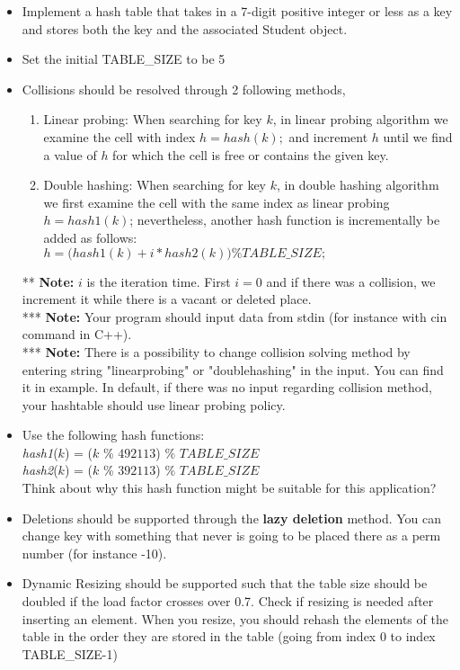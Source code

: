 \documentclass[times, 12pt]{article}
\begin{document}
\begin{itemize}
    \item Implement a hash table that takes in a 7-digit positive integer or less as a key and stores both the key and the associated Student object.
    
    \item Set the initial TABLE\_SIZE to be 5
    
    \item Collisions should be resolved through 2 following methods,
    \begin{enumerate}
        \item Linear probing: When searching for key $k$, in linear probing algorithm we examine the cell with index $h = hash(k);$ and increment $h$ until we find a value of $h$ for which the cell is free or contains the given key.
        \item Double hashing: When searching for key $k$, in double hashing algorithm we first examine the cell with the same index as linear probing $h = hash1(k)$; nevertheless, another hash function is incrementally be added as follows:\\
        $h = \Big(hash1(k) + i * hash2(k)\Big) \%TABLE\_SIZE;$
    \end{enumerate}
    ** \textbf{Note: }$i$ is the iteration time. First $i=0$ and if there was a collision, we increment it while there is a vacant or deleted place.\\
    *** \textbf{Note: }Your program should input data from stdin (for instance with cin command in C++).\\
    *** \textbf{Note: }There is a possibility to change collision solving method by entering string "linearprobing" or "doublehashing" in the input. You can find it in example. In default, if there was no input regarding collision method, your hashtable should use linear probing policy.

    \item Use the following hash functions:\\ \textit{hash1}($k$) = ($k$ \% $492113$) \% $TABLE\_SIZE$\\ \textit{hash2}($k$) = ($k$ \% $392113$) \% $TABLE\_SIZE$\\
    Think about why this hash function might be suitable for this application?

    \item Deletions should be supported through the \textbf{lazy deletion} method. You can change key with something that never is going to be placed there as a perm number (for instance -10).
    
    \item Dynamic Resizing should be supported such that the table size should be doubled if the load factor crosses over 0.7. Check if resizing is needed after inserting an element. When you resize, you should rehash the elements of the table in the order they are stored in the table (going from index 0 to index TABLE\_SIZE-1)
\end{itemize}
\end{document}
